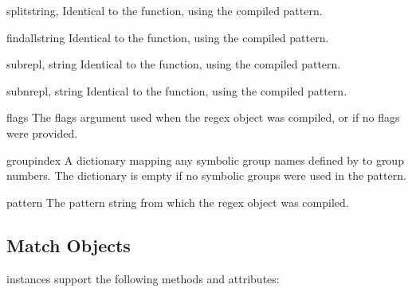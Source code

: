 \begin{methoddesc}[RegexObject]{split}{string, }
Identical to the  function, using the compiled pattern.
\end{methoddesc}

\begin{methoddesc}[RegexObject]{findall}{string}
Identical to the  function, using the compiled pattern.
\end{methoddesc}

\begin{methoddesc}[RegexObject]{sub}{repl, string}
Identical to the  function, using the compiled pattern.
\end{methoddesc}

\begin{methoddesc}[RegexObject]{subn}{repl, string}
Identical to the  function, using the compiled pattern.
\end{methoddesc}


\begin{memberdesc}[RegexObject]{flags}
The flags argument used when the regex object was compiled, or
 if no flags were provided.
\end{memberdesc}

\begin{memberdesc}[RegexObject]{groupindex}
A dictionary mapping any symbolic group names defined by 
 to group numbers.  The dictionary is empty if no
symbolic groups were used in the pattern.
\end{memberdesc}

\begin{memberdesc}[RegexObject]{pattern}
The pattern string from which the regex object was compiled.
\end{memberdesc}


\subsection{Match Objects}
\label{match-objects}

 instances support the following methods and attributes:

